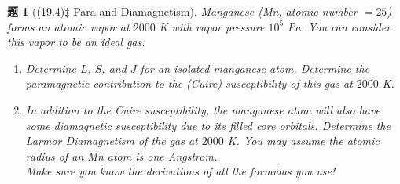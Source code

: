 \documentclass[UTF8,10pt,a4paper]{article}
\theoremstyle{Problem}
\newtheorem{prob}{题}
\theoremstyle{Solution}
\begin{document}
\thispagestyle{FirstPageStyle}
\begin{prob}[(19.4)$\ddagger$ Para and Diamagnetism]
    Manganese (Mn, atomic number $=25$) forms an atomic vapor at $2000$ K with vapor pressure $10^5$ Pa. You can consider this vapor to be an ideal gas.
    \begin{enumerate}
        \item[(a)] Determine $L$, $S$, and $J$ for an isolated manganese atom. Determine the paramagnetic contribution to the (Cuire) susceptibility of this gas at $2000$ K.
        \item[(b)] In addition to the Cuire susceptibility, the manganese atom will also have some diamagnetic susceptibility due to its filled core orbitals. Determine the Larmor Diamagnetism of the gas at $2000$ K. You may assume the atomic radius of an Mn atom is one Angstrom.\\
            Make sure you know the derivations of all the formulas you use!
    \end{enumerate}
\end{prob}
\end{document}
